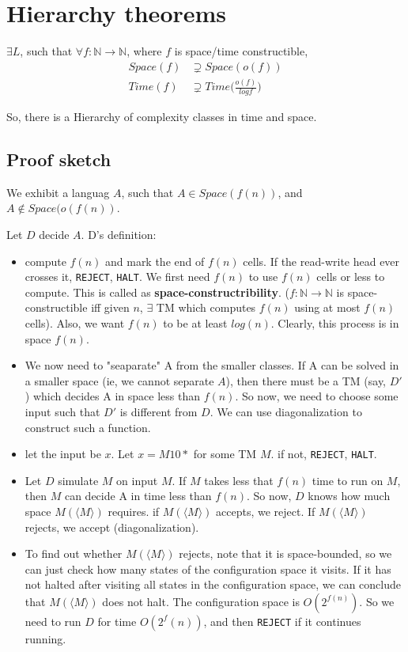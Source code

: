 \section{Hierarchy theorems}
$\exists L$, such that $\forall f: \mathbb{N} \to \mathbb{N}$, where $f$ is
space/time constructible,
\begin{align*}
    Space(f) &\supsetneq Space(o(f)) \\
    Time(f) &\supsetneq Time \bigg (\frac{o(f)}{log f} \bigg )
\end{align*}

So, there is a Hierarchy of complexity classes in time and space.

\subsection{Proof sketch}
We exhibit a languag $A$, such that $A \in Space(f(n))$, and $A \notin Space(o(f(n))$.

Let $D$ decide $A$. D's definition:
\begin{itemize}
    \item compute $f(n)$ and mark the end of $f(n)$ cells. If the read-write head
        ever crosses it, \texttt{REJECT}, \texttt{HALT}. We first need
        $f(n)$ to use $f(n)$ cells or less to compute. This is called as 
        \textbf{space-constructribility}. ($f: \mathbb{N} \to \mathbb{N}$ is
        space-constructible iff given $n$, $\exists$ TM which computes $f(n)$ 
        using at most $f(n)$ cells). Also, we want $f(n)$ to be at least
        $log(n)$. Clearly, this process is in space $f(n)$.

    \item We now need to "seaparate" A from the smaller classes. If A can be
        solved in a smaller space (ie, we cannot separate $A$), then
        there must be a TM (say, $D'$) which decides A in space less than $f(n)$.
        So now, we need to choose some input such that $D'$ is different from $D$.
        We can use diagonalization to construct such a function.

    \item let the input be $x$. Let $x = M10*$ for some TM $M$. if not,
        \texttt{REJECT}, \texttt{HALT}.

    \item Let $D$ simulate $M$ on input $M$. If $M$ takes less that $f(n)$
        time to run on $M$, then $M$ can decide A in time less than $f(n)$.
        So now, $D$ knows how much space $M(\langle M \rangle)$ requires. if $M(\langle M \rangle)$
        accepts, we reject.  If $M(\langle M \rangle)$ rejects, we accept (diagonalization).

    \item To find out whether $M(\langle M \rangle)$ rejects, note that it is space-bounded, so
        we can just check how many states of the configuration space it visits.
        If it has not halted after visiting all states in the configuration
        space, we can conclude that $M(\langle M \rangle)$ does not halt. The configuration space
        is $O(2^{f(n)})$. So we need to run $D$ for time $O(2^f(n))$, and then
        \texttt{REJECT} if it continues running.
\end{itemize}

